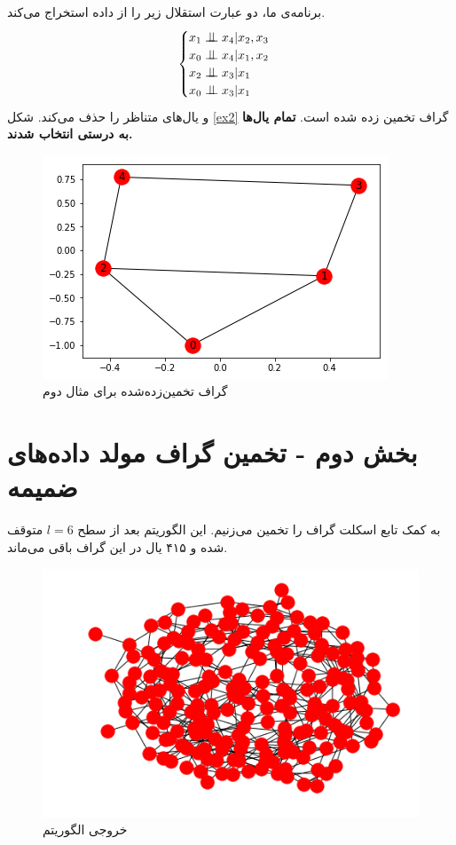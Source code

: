 \documentclass{article}
\begin{document}
برنامه‌ی ما، دو عبارت استقلال زیر را از داده استخراج می‌کند.
\begin{equation}
\begin{cases}
x_1 \bigCI x_4 | x_2, x_3\\
x_0 \bigCI x_4 | x_1, x_2\\
x_2 \bigCI x_3 | x_1\\
x_0 \bigCI x_3 | x_1\\
\end{cases}
\end{equation}
و  یال‌های  متناظر را حذف می‌کند. 
شکل
\eqref{ex2}
گراف تخمین زده شده است. 
\textbf{تمام یال‌ها به درستی انتخاب شدند.}
\begin{figure}[h]
	\centering
	\includegraphics[scale=0.5]{pcex2.png}
	\caption{گراف تخمین‌زده‌شده برای مثال دوم}
	\label{ex2}
\end{figure}
\newpage
\section{بخش دوم - تخمین گراف مولد داده‌های ضمیمه}
به کمک تابع 
اسکلت گراف را تخمین می‌زنیم. این الگوریتم بعد از سطح 
$l = 6$
متوقف شده و ۴۱۵ یال در این گراف باقی می‌ماند.
\begin{figure}[h]
	\centering
	\includegraphics[scale=0.5]{pcaout.png}
	\caption{خروجی الگوریتم}
	\label{out1}
\end{figure}
\end{document}
